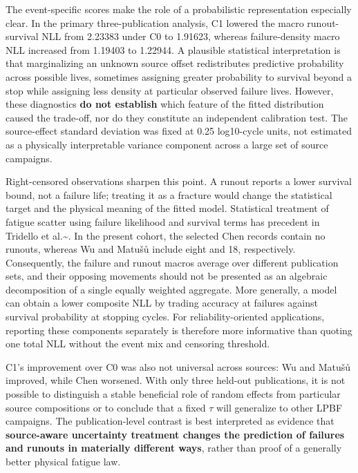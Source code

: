 \documentclass[12pt,a4paper]{article}
\begin{document}
The event-specific scores make the role of a probabilistic representation especially clear. In the primary three-publication analysis, C1 lowered the macro runout-survival NLL from 2.23383 under C0 to 1.91623, whereas failure-density macro NLL increased from 1.19403 to 1.22944. A plausible statistical interpretation is that marginalizing an unknown source offset redistributes predictive probability across possible lives, sometimes assigning greater probability to survival beyond a stop while assigning less density at particular observed failure lives. However, these diagnostics \textbf{do not establish} which feature of the fitted distribution caused the trade-off, nor do they constitute an independent calibration test. The source-effect standard deviation was fixed at 0.25 log10-cycle units, not estimated as a physically interpretable variance component across a large set of source campaigns.

Right-censored observations sharpen this point. A runout reports a lower survival bound, not a failure life; treating it as a fracture would change the statistical target and the physical meaning of the fitted model. Statistical treatment of fatigue scatter using failure likelihood and survival terms has precedent in Tridello et al.\textasciitilde{}\cite{tridello2023a}. In the present cohort, the selected Chen records contain no runouts, whereas Wu and Matušů include eight and 18, respectively. Consequently, the failure and runout macros average over different publication sets, and their opposing movements should not be presented as an algebraic decomposition of a single equally weighted aggregate. More generally, a model can obtain a lower composite NLL by trading accuracy at failures against survival probability at stopping cycles. For reliability-oriented applications, reporting these components separately is therefore more informative than quoting one total NLL without the event mix and censoring threshold.

C1's improvement over C0 was also not universal across sources: Wu and Matušů improved, while Chen worsened. With only three held-out publications, it is not possible to distinguish a stable beneficial role of random effects from particular source compositions or to conclude that a fixed \(\tau\) will generalize to other LPBF campaigns. The publication-level contrast is best interpreted as evidence that \textbf{source-aware uncertainty treatment changes the prediction of failures and runouts in materially different ways}, rather than proof of a generally better physical fatigue law.
\end{document}
